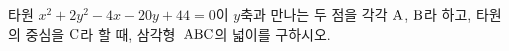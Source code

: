 타원 $x^2+2y^2-4x-20y+44=0$이 $y$축과 만나는 두 점을 각각 $\mathrm{A}$, $\mathrm{B}$라 하고, 타원의 중심을 $\mathrm{C}$라 할 때, 삼각형~$\mathrm{ABC}$의 넓이를 구하시오.
